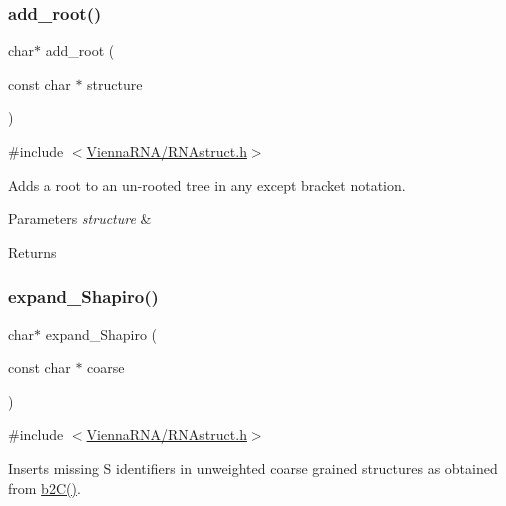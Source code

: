 \subsubsection{\texorpdfstring{add\+\_\+root()}{add\_root()}}
{\footnotesize\ttfamily char$\ast$ add\+\_\+root (\begin{DoxyParamCaption}\item[{const char $\ast$}]{structure }\end{DoxyParamCaption})}



{\ttfamily \#include $<$\hyperlink{RNAstruct_8h}{Vienna\+R\+N\+A/\+R\+N\+Astruct.\+h}$>$}



Adds a root to an un-\/rooted tree in any except bracket notation. 


\begin{DoxyParams}{Parameters}
{\em structure} & \\
\hline
\end{DoxyParams}
\begin{DoxyReturn}{Returns}

\end{DoxyReturn}
\mbox{\label{group__struct__utils_gabe3d815b420dc4553bfb23511198b4c6}} 
\subsubsection{\texorpdfstring{expand\+\_\+\+Shapiro()}{expand\_Shapiro()}}
{\footnotesize\ttfamily char$\ast$ expand\+\_\+\+Shapiro (\begin{DoxyParamCaption}\item[{const char $\ast$}]{coarse }\end{DoxyParamCaption})}



{\ttfamily \#include $<$\hyperlink{RNAstruct_8h}{Vienna\+R\+N\+A/\+R\+N\+Astruct.\+h}$>$}



Inserts missing \textquotesingle{}S\textquotesingle{} identifiers in unweighted coarse grained structures as obtained from \hyperlink{group__struct__utils_ga9c80d92391f2833549a8b6dac92233f0}{b2\+C()}. 


